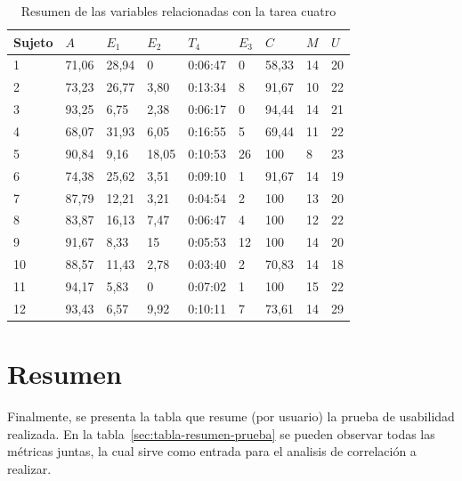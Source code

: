 \begin{table}[H]
\centering
\footnotesize
\begin{tabular}{|p{1.4cm}|p{1.4cm}|p{1.4cm}|p{1.4cm}|p{1.4cm}|p{1.4cm}|p{1.4cm}|p{1.4cm}|p{1.4cm}|}
\hline
Sujeto& $A$ & $E_1$ & $E_2$  & $T_4$      & $E_3$ & $C$ &  $M$ & $U$ \\
 \hline 
1  &  71,06 & 28,94 &  0     &  0:06:47   &  0  &  58,33  & 14 &  20  \\ 
2  &  73,23 & 26,77 &  3,80  &  0:13:34   &  8  &  91,67  & 10 &  22 \\
3  &  93,25 & 6,75  &  2,38  &  0:06:17   &  0  &  94,44  & 14 &  21 \\
4  &  68,07 & 31,93 &  6,05  &  0:16:55   &  5  &  69,44  & 11 &  22 \\
5  &  90,84 & 9,16  &  18,05 &  0:10:53   &  26 &  100      & 8  &  23 \\
6  &  74,38 & 25,62 &  3,51  &  0:09:10   &  1  &  91,67  & 14 &  19  \\
7  &  87,79 & 12,21 &  3,21  &  0:04:54   &  2  &  100      & 13 &  20  \\
8  &  83,87 & 16,13 &  7,47  &  0:06:47   &  4  &  100      & 12 &  22  \\
9  &  91,67 & 8,33  &  15    &  0:05:53   &  12 &  100      & 14 &  20  \\
10 &  88,57 & 11,43 &  2,78  &  0:03:40   &  2  &  70,83  & 14 &  18  \\
11 &  94,17 & 5,83  &  0     &  0:07:02   &  1  &  100      & 15 &  22  \\
12 &  93,43 & 6,57  &  9,92  &  0:10:11   &  7  &  73,61  & 14 &  29  \\
    \hline
\end{tabular}
\caption{Resumen de las variables relacionadas con la tarea cuatro}
\label{sec:tabla-tarea4}
\end{table}

 
\section{Resumen}

Finalmente, se presenta la tabla que resume (por usuario) la prueba de usabilidad realizada. En la tabla~\ref{sec:tabla-resumen-prueba}
se pueden observar todas las m\'etricas juntas, la cual sirve como entrada 
para el analisis de correlaci\'on a realizar.

